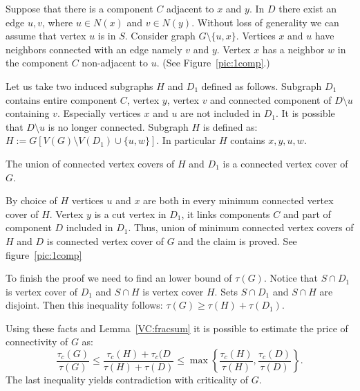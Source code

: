 \begin{myproof}
	Suppose that there is a component \(C\) adjacent to \(x\) and \(y\).
	In \(D\) there exist an edge \(u, v\), where \(u \in N(x)\) and \(v \in N(y)\).
	Without loss of generality we can assume that vertex \(u\) is in \(S\).
	Consider graph \(G \setminus \{u, x\}\). 
	Vertices \(x\) and \(u\) have neighbors connected with an edge namely \(v\) and \(y\). 
	Vertex \(x\) has a neighbor \(w\) in the component \(C\) non-adjacent to \(u\).
	(See Figure~\ref{pic:1comp}.)
	
	Let us take two induced subgraphs \(H\) and \(D_1\) defined as follows.
	Subgraph \(D_1\) contains entire component \(C\), vertex \(y\), vertex \(v\) and connected component of \(D \setminus u\) containing \(v\).
	Especially vertices \(x\) and \(u\) are not included in \(D_1\). It is possible that \(D \setminus {u}\) is no longer connected. 
	Subgraph \(H\) is defined as: \(H := G[V(G) \setminus V(D_1) \cup \{u, w\}].\)
	In particular \(H\) contains \(x, y, u, w\).
	\begin{claim}
		The union of connected vertex covers of \(H\) and \(D_1\) is a connected vertex cover of \(G\).
	\end{claim}
	
	By choice of \(H\) vertices \(u\) and \(x\) are both in every minimum connected vertex cover of \(H\).
	Vertex \(y\) is a cut vertex in \(D_1\), it links components \(C\) and part of component \(D\) included in \(D_1\). 
	Thus, union of minimum connected vertex covers of \(H\) and \(D\) is connected vertex cover of \(G\) and the claim is proved.
	See figure~\ref{pic:1comp}

	
	To finish the proof we need to find an lower bound of \(\tau(G)\).
	Notice that \(S \cap D_1\) is vertex cover of \(D_1\) and \(S \cap H\) is vertex cover \(H\).
	Sets \(S \cap D_1\) and \(S \cap H\) are disjoint.
	Then this inequality follows: \(\tau(G) \geq {\tau(H) + \tau(D_1)}\).

	Using these facts and Lemma~\ref{VC:fracsum} it is possible to estimate the price of connectivity of \(G\) as:
	\[\frac{\tau_c(G)}{\tau(G)} \leq {\frac{\tau_c(H) + \tau_c(D}{\tau(H) + \tau(D)}} \leq {\max\left\{ \frac{\tau_c(H)}{\tau(H)}, \frac{\tau_c(D)}{\tau(D)}\right\}}.\]
	The last inequality yields contradiction with criticality of \(G\).
\end{myproof}

